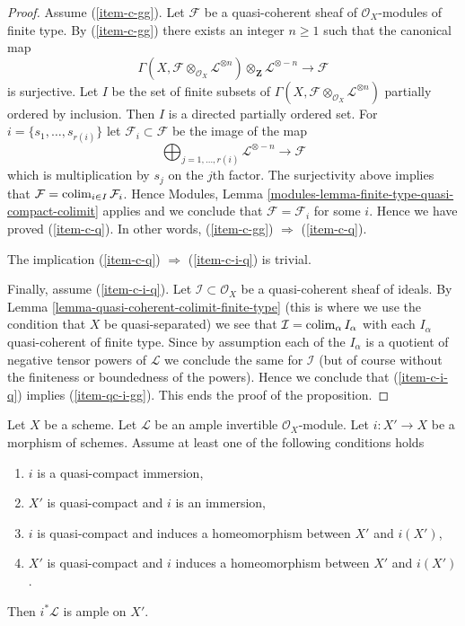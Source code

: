 \begin{proof}
\medskip\noindent
Assume (\ref{item-c-gg}). Let $\mathcal{F}$ be a quasi-coherent
sheaf of $\mathcal{O}_X$-modules of finite type.
By (\ref{item-c-gg}) there exists an integer $n \geq 1$ such that
the canonical map
$$
\Gamma(X, \mathcal{F} \otimes_{\mathcal{O}_X} \mathcal{L}^{\otimes n})
\otimes_{\mathbf{Z}} \mathcal{L}^{\otimes -n}
\longrightarrow
\mathcal{F}
$$
is surjective. Let $I$ be the set of finite subsets of
$\Gamma(X, \mathcal{F} \otimes_{\mathcal{O}_X} \mathcal{L}^{\otimes n})$
partially ordered by inclusion. Then $I$ is a directed partially ordered set.
For $i = \{s_1, \ldots, s_{r(i)}\}$ let $\mathcal{F}_i \subset \mathcal{F}$
be the image of the map
$$
\bigoplus\nolimits_{j = 1, \ldots, r(i)} \mathcal{L}^{\otimes -n}
\longrightarrow
\mathcal{F}
$$
which is multiplication by $s_j$ on the $j$th factor. The surjectivity above
implies that $\mathcal{F} = \mathop{\mathrm{colim}}\nolimits_{i \in I} \mathcal{F}_i$.
Hence Modules, Lemma \ref{modules-lemma-finite-type-quasi-compact-colimit}
applies and we conclude that
$\mathcal{F} = \mathcal{F}_i$ for some $i$.
Hence we have proved (\ref{item-c-q}). In other words,
(\ref{item-c-gg}) $\Rightarrow$ (\ref{item-c-q}).

\medskip\noindent
The implication (\ref{item-c-q}) $\Rightarrow$ (\ref{item-c-i-q}) is trivial.

\medskip\noindent
Finally, assume (\ref{item-c-i-q}).
Let $\mathcal{I} \subset \mathcal{O}_X$ be a quasi-coherent sheaf
of ideals. By Lemma \ref{lemma-quasi-coherent-colimit-finite-type}
(this is where we use the condition that $X$ be quasi-separated)
we see that $\mathcal{I} = \mathop{\mathrm{colim}}\nolimits_\alpha I_\alpha$ with
each $I_\alpha$ quasi-coherent of finite type. Since by assumption each of
the $I_\alpha$ is a quotient of negative tensor powers of
$\mathcal{L}$ we conclude the same for $\mathcal{I}$ (but of course
without the finiteness or boundedness of the powers). Hence
we conclude that (\ref{item-c-i-q}) implies (\ref{item-qc-i-gg}).
This ends the proof of the proposition.
\end{proof}

\begin{lemma}
\label{lemma-ample-on-locally-closed}
Let $X$ be a scheme. Let $\mathcal{L}$ be an ample invertible
$\mathcal{O}_X$-module. Let $i : X' \to X$ be a morphism of schemes.
Assume at least one of the following conditions holds
\begin{enumerate}
\item $i$ is a quasi-compact immersion,
\item $X'$ is quasi-compact and $i$ is an immersion,
\item $i$ is quasi-compact and induces a homeomorphism
between $X'$ and $i(X')$,
\item $X'$ is quasi-compact and $i$ induces a homeomorphism
between $X'$ and $i(X')$.
\end{enumerate}
Then $i^*\mathcal{L}$ is ample on $X'$.
\end{lemma}

